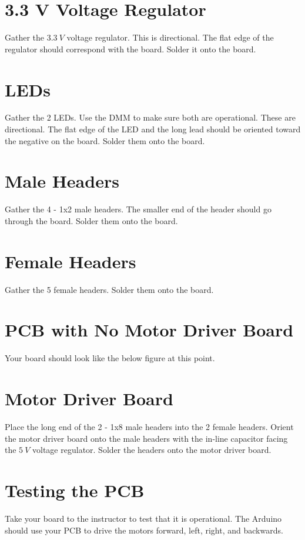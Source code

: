 \documentclass{handout}
\begin{document}
	\section{3.3 V Voltage Regulator}
	Gather the $3.3\ V$ voltage regulator. This is directional. The flat edge of the regulator should correspond with the board. Solder it onto the board.
	

	
	\section{LEDs}
	Gather the 2 LEDs. Use the DMM to make sure both are operational. These are directional. The flat edge of the LED and the long lead should be oriented toward the negative on the board. Solder them onto the board.

	
	\section{Male Headers}
	Gather the 4 - 1x2 male headers. The smaller end of the header should go through the board. Solder them onto the board.
	


\newpage
\clearpage
\pagebreak

	\section{Female Headers}
	Gather the 5 female headers. Solder them onto the board.
	


	\section{PCB with No Motor Driver Board}
	Your board should look like the below figure at this point.


	\section{Motor Driver Board}
	Place the long end of the 2 - 1x8 male headers into the 2 female headers. Orient the motor driver board onto the male headers with the in-line capacitor facing the $5\ V$ voltage regulator. Solder the headers onto the motor driver board.

	
\newpage
\clearpage
\pagebreak
	


	\section{Testing the PCB}
	Take your board to the instructor to test that it is operational. The Arduino should use your PCB to drive the motors forward, left, right, and backwards.
	
\end{document}

